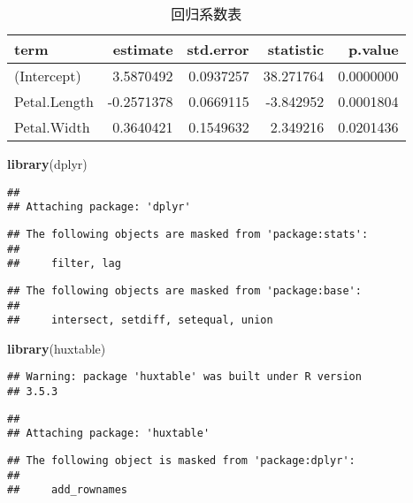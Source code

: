 \documentclass[singlesided]{Style/ucasthesis}%
\newenvironment{Shaded}{\begin{snugshade}}{\end{snugshade}}
\newcommand{\KeywordTok}[1]{\textcolor[rgb]{0.13,0.29,0.53}{\textbf{{#1}}}}
\newcommand{\NormalTok}[1]{{#1}}
\begin{document}
\begin{table}[t]

\caption{\label{tab:kable-broom}回归系数表}
\centering
\begin{tabular}{l|r|r|r|r}
\hline
term & estimate & std.error & statistic & p.value\\
\hline
(Intercept) & 3.5870492 & 0.0937257 & 38.271764 & 0.0000000\\
\hline
Petal.Length & -0.2571378 & 0.0669115 & -3.842952 & 0.0001804\\
\hline
Petal.Width & 0.3640421 & 0.1549632 & 2.349216 & 0.0201436\\
\hline
\end{tabular}
\end{table}

\begin{Shaded}
\begin{Highlighting}[]
\KeywordTok{library}\NormalTok{(dplyr)}
\end{Highlighting}
\end{Shaded}

\begin{verbatim}
## 
## Attaching package: 'dplyr'
\end{verbatim}

\begin{verbatim}
## The following objects are masked from 'package:stats':
## 
##     filter, lag
\end{verbatim}

\begin{verbatim}
## The following objects are masked from 'package:base':
## 
##     intersect, setdiff, setequal, union
\end{verbatim}

\begin{Shaded}
\begin{Highlighting}[]
\KeywordTok{library}\NormalTok{(huxtable)}
\end{Highlighting}
\end{Shaded}

\begin{verbatim}
## Warning: package 'huxtable' was built under R version
## 3.5.3
\end{verbatim}

\begin{verbatim}
## 
## Attaching package: 'huxtable'
\end{verbatim}

\begin{verbatim}
## The following object is masked from 'package:dplyr':
## 
##     add_rownames
\end{verbatim}
\end{document}
